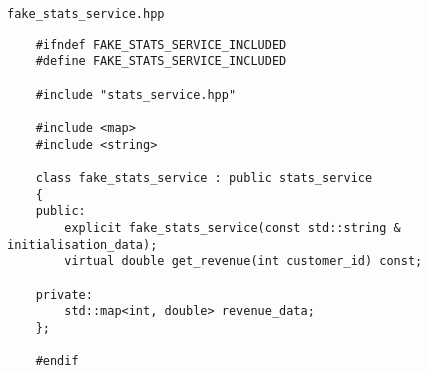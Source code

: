 \texttt{fake_stats_service.hpp}

\begin{verbatim}
    #ifndef FAKE_STATS_SERVICE_INCLUDED
    #define FAKE_STATS_SERVICE_INCLUDED
    
    #include "stats_service.hpp"
    
    #include <map>
    #include <string>
    
    class fake_stats_service : public stats_service
    {
    public:
        explicit fake_stats_service(const std::string & initialisation_data);
        virtual double get_revenue(int customer_id) const;
    
    private:
        std::map<int, double> revenue_data;
    };
    
    #endif
\end{verbatim}